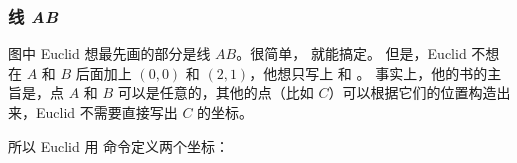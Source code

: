 \begin{codeexample}

\usetikzlibrary{calc,intersections,through,backgrounds}
\end{codeexample}

\begin{codeexample}
\usemodule[tikz]
\end{codeexample}


\subsubsection{线 \emph{AB}}

\bohs

图中 Euclid 想最先画的部分是线 $AB$。很简单， 就能搞定。
但是，Euclid 不想在 $A$ 和 $B$ 后面加上 $(0,0)$ 和 $(2,1)$，他想只写上  和 。
事实上，他的书的主旨是，点 $A$ 和 $B$ 可以是任意的，其他的点（比如 $C$）可以根据它们的位置构造出来，Euclid 不需要直接写出 $C$ 的坐标。

所以 Euclid 用 \ltz{\\coordinate} 命令定义两个坐标：

\eohs

\begin{codeexample}[]
\end{codeexample}

